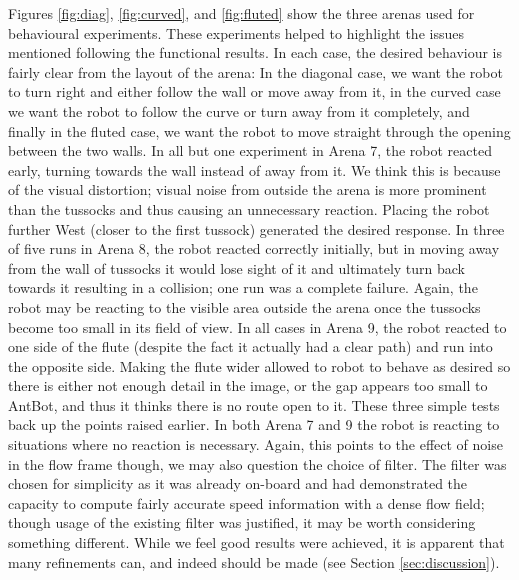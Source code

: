 \documentclass[a4paper,12pt,twoside,openright]{article}
\begin{document}
Figures \ref{fig:diag}, \ref{fig:curved}, and \ref{fig:fluted} show the three arenas used for behavioural experiments. These experiments
helped to highlight the issues mentioned following the functional results. In each case, the desired behaviour is fairly clear from the layout of
the arena: In the diagonal case, we want the robot to turn right and either follow the wall or move away from it, in the curved case we want the
robot to follow the curve or turn away from it completely, and finally in the fluted case, we want the robot to move straight through the
opening between the two walls. In all but one experiment in Arena 7, the robot reacted early, turning towards the wall instead of away from it. We
think this is because of the visual distortion; visual noise from outside the arena is more prominent than the tussocks and thus causing an unnecessary
reaction. Placing the robot further West (closer to the first tussock) generated the desired response. 
In three of five runs in Arena 8, the robot reacted correctly initially, but in moving away from the wall of tussocks it would lose sight of it and ultimately
turn back towards it resulting in a collision; one run was a complete failure. Again, the robot may be reacting to the visible area outside the arena once
the tussocks become too small in its field of view. In all cases in Arena 9, the robot reacted to one side of the
flute (despite the fact it actually
had a clear path) and run into the opposite side. Making the flute wider allowed to robot to behave as desired so there is either not enough detail in
the image, or the gap appears too small to AntBot, and thus it thinks there is no route open to it. These three simple tests back up the points raised earlier.
In both Arena 7 and 9 the robot
is reacting to situations where no reaction is necessary. Again, this points to the effect of noise in the flow frame though, we may also
question the choice of filter. The filter was chosen for simplicity as it was already on-board and had demonstrated the capacity to compute
fairly accurate speed information \cite{Scimeca2017} with a dense flow field; though usage of the existing filter was justified,
it may be worth considering something different. While we feel good results were achieved, it is apparent that many refinements can, and indeed should
be made (see Section \ref{sec:discussion}).
\end{document}
